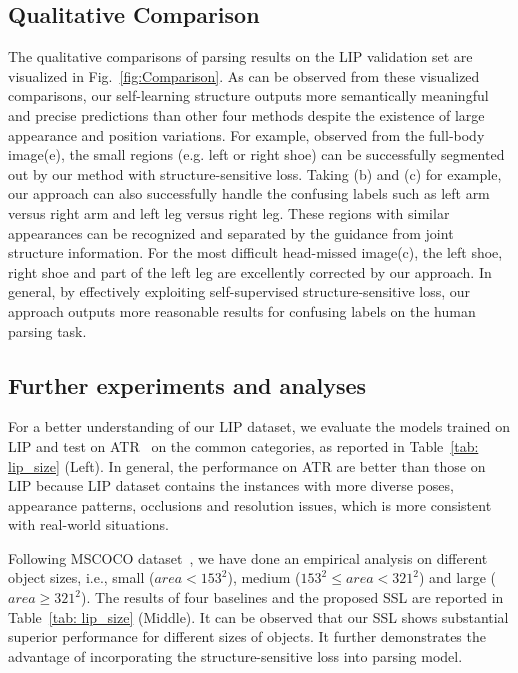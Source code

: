 \documentclass[10pt,twocolumn,letterpaper]{article}
\begin{document}
\subsection{Qualitative Comparison}
The qualitative comparisons of parsing results on the LIP validation set are visualized in Fig.~\ref{fig:Comparison}. As can be observed from these visualized comparisons, our self-learning structure outputs more semantically meaningful and precise predictions than other four methods despite the existence of large appearance and position variations. For example, observed from the full-body image(e), the small regions (e.g. left or right shoe) can be successfully segmented out by our method with structure-sensitive loss. Taking (b) and (c) for example, our approach can also successfully handle the confusing labels such as left arm versus right arm and left leg versus right leg. These regions with similar appearances can be recognized and separated by the guidance from joint structure information. For the most difficult head-missed image(c), the left shoe, right shoe and part of the left leg are excellently corrected by our approach. In general, by effectively exploiting self-supervised structure-sensitive loss, our approach outputs more reasonable results for confusing labels on the human parsing task.  

\subsection{Further experiments and analyses}
For a better understanding of our LIP dataset, we evaluate the models trained on LIP and test on ATR~\cite{Co-CNN} on the common categories, as reported in Table~\ref{tab: lip_size} (Left). In general, the performance on ATR are better than those on LIP because LIP dataset contains the instances with more diverse poses, appearance patterns, occlusions and resolution issues, which is more consistent with real-world situations. 

Following MSCOCO dataset~\cite{DBLP:journals/corr/LinMBHPRDZ14}, we have done an empirical analysis on different object sizes, i.e., small ($area < 153^2$), medium ($153^2 \leq area < 321^2$) and large ($area \geq 321^2$). The results of four baselines and the proposed SSL are reported in Table~\ref{tab: lip_size} (Middle). It can be observed that our SSL shows substantial superior performance for different sizes of objects. It further demonstrates the advantage of incorporating the structure-sensitive loss into parsing model.
\end{document}
